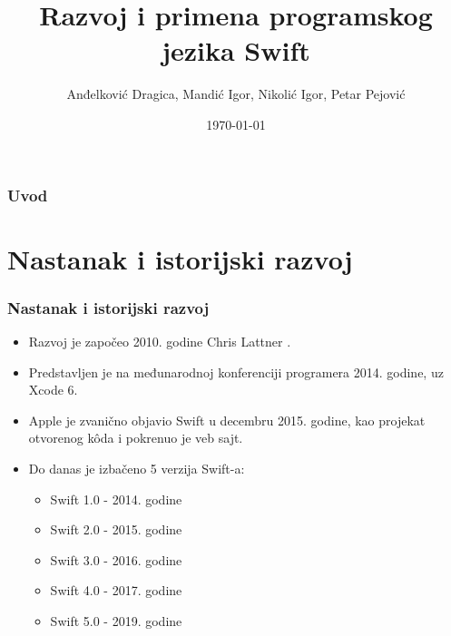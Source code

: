 \documentclass{beamer}
\title[]{Razvoj i primena programskog jezika Swift} %
\author[]{Anđelković Dragica, Mandić Igor, Nikolić Igor, Petar Pejović} %
\institute[Matf] %
{
Matematički fakultet \\ %
\medskip
\textit{andjelkovic.dragica96@gmail.com, igormandic996@gmail.com, \\ igor.nikolic032@hotmail.com, petar.pejovic8@gmail.com} %
}
\date{\today} %
\begin{document}
\begin{frame}
\titlepage %
\end{frame}

\begin{frame}
\frametitle{Uvod} %
\tableofcontents %





\end{frame}
\section{Nastanak i istorijski razvoj}
\begin{frame}
\frametitle{Nastanak i istorijski razvoj}
\begin{itemize}
\item  Razvoj je započeo 2010. godine Chris Lattner \cite{mastering_swift3}.
\item  Predstavljen je na međunarodnoj konferenciji programera 2014. godine, uz  Xcode 6\cite{thenextweb_sajt}.
\item Apple je zvanično objavio Swift u decembru 2015. godine, kao projekat otvorenog k\^{o}da i pokrenuo je veb sajt.
\item Do danas je izbačeno 5 verzija Swift-a:
\begin{itemize}
\item{Swift 1.0} - 2014. godine
\item{Swift 2.0} - 2015. godine
\item{Swift 3.0} - 2016. godine
\item{Swift 4.0} - 2017. godine
\item{Swift 5.0} - 2019. godine
\end{itemize}
\end{itemize}

\end{frame}
\end{document}
